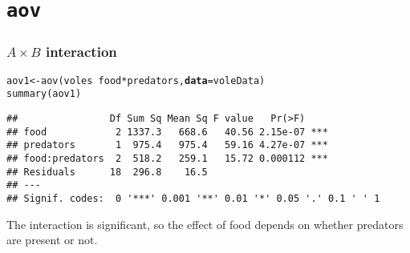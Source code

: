 \documentclass[color=usenames,dvipsnames]{beamer}\usepackage[]{graphicx}\usepackage[]{color}
\makeatletter
\newcommand{\hlopt}[1]{\textcolor[rgb]{0,0,0}{#1}}%
\newcommand{\hlstd}[1]{\textcolor[rgb]{0,0,0}{#1}}%
\newcommand{\hlkwb}[1]{\textcolor[rgb]{0,0.341,0.682}{#1}}%
\newcommand{\hlkwc}[1]{\textcolor[rgb]{0,0,0}{\textbf{#1}}}%
\newcommand{\hlkwd}[1]{\textcolor[rgb]{0.004,0.004,0.506}{#1}}%
\newenvironment{kframe}{%
 \def\at@end@of@kframe{}%
 \ifinner\ifhmode%
  \def\at@end@of@kframe{\end{minipage}}%
  \begin{minipage}{\columnwidth}%
 \fi\fi%
 \def\FrameCommand##1{\hskip\@totalleftmargin \hskip-\fboxsep
 \colorbox{shadecolor}{##1}\hskip-\fboxsep
     \hskip-\linewidth \hskip-\@totalleftmargin \hskip\columnwidth}%
 \MakeFramed {\advance\hsize-\width
   \@totalleftmargin\z@ \linewidth\hsize
   \@setminipage}}%
 {\par\unskip\endMakeFramed%
 \at@end@of@kframe}
\newenvironment{knitrout}{}{} %
\makeatother
\begin{document}
\section{\tt aov}




\begin{frame}[fragile]
  \frametitle{$A \times B$ interaction}
\begin{knitrout}\footnotesize
{}\color{fgcolor}\begin{kframe}
\begin{alltt}
\hlstd{aov1} \hlkwb{<-} \hlkwd{aov}\hlstd{(voles} \hlopt{~} \hlstd{food} \hlopt{*} \hlstd{predators,} \hlkwc{data}\hlstd{=voleData)}
\hlkwd{summary}\hlstd{(aov1)}
\end{alltt}
\begin{verbatim}
##                Df Sum Sq Mean Sq F value   Pr(>F)    
## food            2 1337.3   668.6   40.56 2.15e-07 ***
## predators       1  975.4   975.4   59.16 4.27e-07 ***
## food:predators  2  518.2   259.1   15.72 0.000112 ***
## Residuals      18  296.8    16.5                     
## ---
## Signif. codes:  0 '***' 0.001 '**' 0.01 '*' 0.05 '.' 0.1 ' ' 1
\end{verbatim}
\end{kframe}
\end{knitrout}
\pause
\vfill
The interaction is significant, so the effect of food depends on
whether predators are present or not. %
\end{frame}




\end{document}
